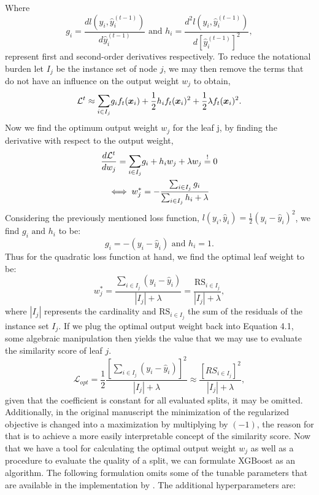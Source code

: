 \documentclass[a4paper,12pt, headsepline]{scrartcl}
\numberwithin{equation}{section}
\begin{document}
Where 
\[
g_i = \frac{d l(y_i, \hat y_i^{(t-1)})}{d \hat y_i^{(t-1)}} \text{ and } h_i = \frac{d^2 l(y_i, \hat y_i^{(t-1)})}{d \left[\hat y_i^{(t-1)}\right]^2},
\]
represent first and second-order derivatives respectively. To reduce the notational burden let $I_j$ be the instance set of node $j$, we may then remove the terms that do not have an influence on the output weight $w_j$ to obtain, 
\begin{gather}
	\mathcal{L}^t \approx \mathlarger{\sum}\limits_{i \in I_j} g_i f_t(\bm x_i) + \frac{1}{2}h_i f_t( \bm x_i)^2 + \frac{1}{2}\lambda f_t(\bm x_i)^2.
\end{gather}
Now we find the optimum output weight $w_j$ for the leaf j, by finding the derivative with respect to the output weight,
\begin{gather*}
	\frac{d \mathcal{L}^t}{d w_j} =  \mathlarger{\sum}\limits_{i \in I_j} g_i + h_i w_j + \lambda w_j \overset{!}{=} 0 \\ \iff w^*_j = - \frac{\sum_{i \in I_j} g_i}{\sum_{i \in I_j} h_i + \lambda}
\end{gather*}
Considering the previously mentioned loss function, $l(y_i, \hat y_i) = \frac{1}{2} (y_i - \hat  y_i)^2$, we find $g_i \text{ and } h_i$ to be:
\[
g_i = -(y_i - \hat y_i)\text{ and } h_i = 1.
\]
Thus for the quadratic loss function at hand, we find the optimal leaf weight to be:
\[
w^*_j =  \frac{\sum_{i \in I_j} (y_i - \hat  y_i)}{|I_j| + \lambda} = \frac{\text{RS}_{i \in I_j}}{|I_j| + \lambda},
\]
where $|I_j|$ represents the cardinality and $\text{RS}_{i \in I_j}$ the sum of the residuals of the instance set $I_j$. If we plug the optimal output weight back into Equation 4.1, some algebraic manipulation then yields the value that we may use to evaluate the similarity score of leaf $j$.
\[
\mathcal{L}_{opt} = \frac{1}{2}\frac{[\sum_{i \in I_j} (y_i - \hat  y_i)]^2}{|I_j| + \lambda} \approx \frac{[RS_{i \in I_j}]^2}{|I_j| + \lambda},
\]
given that the coefficient is constant for all evaluated splits, it may be omitted. Additionally, in the original manuscript the minimization of the regularized objective is changed into a maximization by multiplying by $(-1)$, the reason for that is to achieve a more easily interpretable concept of the similarity score. Now that we have a tool for calculating the optimal output weight $w_j$ as well as a procedure to evaluate the quality of a split, we can formulate XGBoost as an algorithm. The following formulation omits some of the tunable parameters that are available in the implementation by \citet{xgboost}. The additional hyperparameters are:
\end{document}
